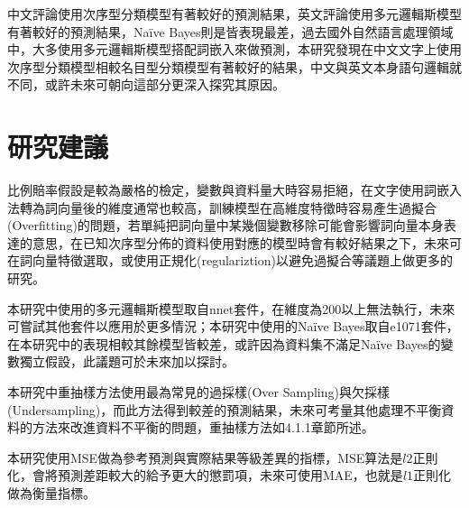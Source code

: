 	中文評論使用次序型分類模型有著較好的預測結果，英文評論使用多元邏輯斯模型有著較好的預測結果，Naïve Bayes則是皆表現最差，過去國外自然語言處理領域中，大多使用多元邏輯斯模型搭配詞嵌入來做預測，本研究發現在中文文字上使用次序型分類模型相較名目型分類模型有著較好的結果，中文與英文本身語句邏輯就不同，或許未來可朝向這部分更深入探究其原因。
	
\newpage

\section{研究建議}

	比例賠率假設是較為嚴格的檢定，變數與資料量大時容易拒絕，在文字使用詞嵌入法轉為詞向量後的維度通常也較高，訓練模型在高維度特徵時容易產生過擬合(Overfitting)的問題，若單純把詞向量中某幾個變數移除可能會影響詞向量本身表達的意思，在已知次序型分佈的資料使用對應的模型時會有較好結果之下，未來可在詞向量特徵選取，或使用正規化(regulariztion)以避免過擬合等議題上做更多的研究。
	
	本研究中使用的多元邏輯斯模型取自nnet套件，在維度為200以上無法執行，未來可嘗試其他套件以應用於更多情況；本研究中使用的Naïve Bayes取自e1071套件，在本研究中的表現相較其餘模型皆較差，或許因為資料集不滿足Naïve Bayes的變數獨立假設，此議題可於未來加以探討。
	
	本研究中重抽樣方法使用最為常見的過採樣(Over Sampling)與欠採樣(Undersampling)，而此方法得到較差的預測結果，未來可考量其他處理不平衡資料的方法來改進資料不平衡的問題，重抽樣方法如4.1.1章節所述。
	
	本研究使用MSE做為參考預測與實際結果等級差異的指標，MSE算法是$l2$正則化，會將預測差距較大的給予更大的懲罰項，未來可使用MAE，也就是$l1$正則化做為衡量指標。



%


